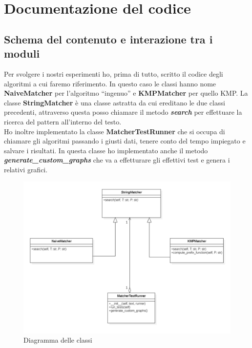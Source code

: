 \documentclass{article}
\begin{document}
\newpage
\section{Documentazione del codice}
\subsection{Schema del contenuto e interazione tra i moduli}
Per svolgere i nostri esperimenti ho, prima di tutto, scritto il codice degli algoritmi a cui faremo riferimento. In questo caso le classi hanno nome \textbf{NaiveMatcher} per l'algoritmo ``ingenuo'' e \textbf{KMPMatcher} per quello KMP. La classe \textbf{StringMatcher} è una classe astratta da cui ereditano le due classi precedenti, attraverso questa posso chiamare il metodo \textbf{\textit{search}} per effettuare la ricerca del pattern all'interno del testo.\\
Ho inoltre implementato la classe \textbf{MatcherTestRunner} che si occupa di chiamare gli algoritmi passando i giusti dati, tenere conto del tempo impiegato e salvare i risultati. In questa classe ho implementato anche il metodo \textbf{\textit{generate\_custom\_graphs}} che va a effetturare gli effettivi test e genera i relativi grafici.
\begin{figure}[H]
    \centering
    \includegraphics[width=1\textwidth]{img/UML.png}
    \caption{Diagramma delle classi}
    \label{fig:uml-diagram}
\end{figure}
\end{document}
